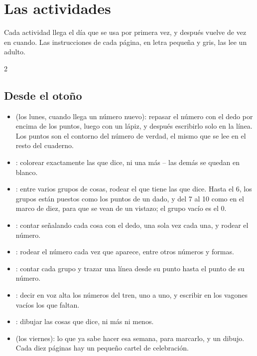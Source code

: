 \section*{Las actividades}

Cada actividad llega el día que se usa por primera vez, y después vuelve
de vez en cuando. Las instrucciones de cada página, en letra pequeña y
gris, las lee un adulto.

{\small
\begin{multicols}{2}
\raggedright
\subsection*{Desde el otoño}
\begin{itemize}[leftmargin=5mm, itemsep=1pt, topsep=0pt]
\item \textbf{\lblTraza} (los lunes, cuando llega un número nuevo):
  repasar el número con el dedo por encima de los puntos, luego con un
  lápiz, y después escribirlo solo en la línea. Los puntos son el
  contorno del número de verdad, el mismo que se lee en el resto del
  cuaderno.
\item \textbf{\lblColorea}: colorear exactamente las que dice, ni una
  más -- las demás se quedan en blanco.
\item \textbf{\lblRodea}: entre varios grupos de cosas, rodear el que
  tiene las que dice. Hasta el 6, los grupos están puestos como los
  puntos de un dado, y del 7 al 10 como en el marco de diez, para que se
  vean de un vistazo; el grupo vacío es el 0.
\item \textbf{\lblCuenta}: contar señalando cada cosa con el dedo, una
  sola vez cada una, y rodear el número.
\item \textbf{\lblBusca}: rodear el número cada vez que aparece, entre
  otros números y formas.
\item \textbf{\lblUne}: contar cada grupo y trazar una línea desde su
  punto hasta el punto de su número.
\item \textbf{\lblCompleta}: decir en voz alta los números del tren, uno
  a uno, y escribir en los vagones vacíos los que faltan.
\item \textbf{\lblDibuja}: dibujar las cosas que dice, ni más ni menos.
\item \textbf{\lblRepasa} (los viernes): lo que ya sabe hacer esa
  semana, para marcarlo, y un dibujo. Cada diez páginas hay un pequeño
  cartel de celebración.
\end{itemize}


\end{multicols}}
